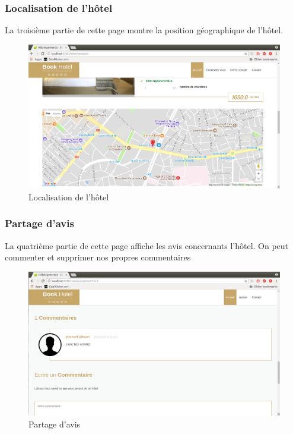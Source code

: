 \documentclass[12pt,a4paper]{report}
\begin{document}
	\subsubsection{Localisation de l'hôtel}
	La troisième partie de cette page montre la position géographique de l'hôtel.\\
	\vspace{2cm}
	\begin{figure}[!hbtp]
		\centering
		\includegraphics[scale=0.3]{./graphics/map.png}
		\caption{Localisation de l'hôtel}
		\end{figure}
		\newpage

	\subsubsection{Partage d'avis}
	La quatrième partie de cette page affiche les avis concernants l'hôtel. On peut commenter et supprimer nos propres commentaires\\
	\vspace{2cm}
	\begin{figure}[!hbtp]
		\centering
		\includegraphics[scale=0.3]{./graphics/comment.png}
		\caption{Partage d'avis}
		\end{figure}
		\newpage
\end{document}
